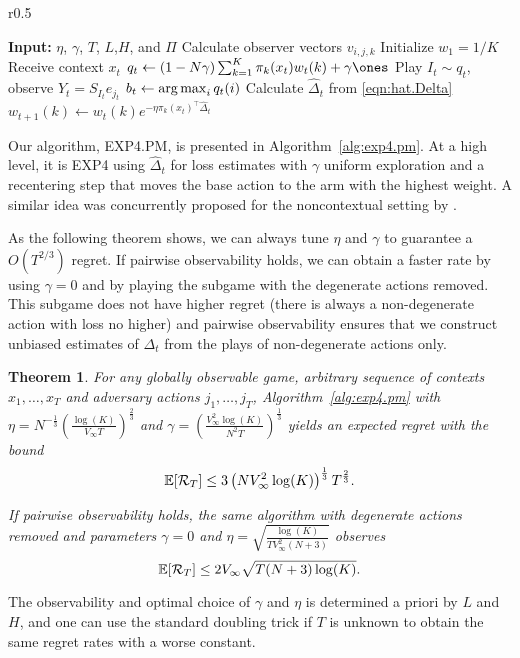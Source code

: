 \documentclass{article}
\newcommand{\regret}{\mathcal{R}}
\newtheorem{theorem}{Theorem}
\begin{document}
  \begin{wrapfigure}[14]{r}{0.5\textwidth}
    \vspace{-1.7em}
\begin{minipage}{.5\textwidth}
\begin{algorithm}[H]
  \caption{Recentered EXP4.PM}
  \label{alg:exp4.pm}
   \begin{algorithmic}
      \STATE \textbf{Input: } $\eta$, $\gamma$, $T$, $L$,$H$, and $\Pi$
      \STATE Calculate observer vectors $v_{i,j,k}$
    \STATE Initialize $w_1 = 1/K$
      \STATE Receive context $x_t$
      \STATE $q_t \leftarrow (1-N \gamma)\sum_{k=1}^K \pi_k(x_t) w_t(k) + \gamma\ones$
      \STATE Play $I_t\sim q_t$, observe $Y_t = S_{I_t} e_{j_t}$ 
      \STATE $b_t \leftarrow \operatorname*{arg\,max}_i q_t(i)$
      \STATE Calculate
         $\hat\Delta_{t}$ from \eqref{eqn:hat.Delta}
      \STATE $w_{t+1}(k) \leftarrow w_t(k)e^{-\eta\pi_k(x_t)^\top \hat\Delta_t}$
      \ENDFOR
\end{algorithmic}
\end{algorithm}
\end{minipage}
\end{wrapfigure}

Our algorithm, \textsc{EXP4.PM}, is presented in Algorithm~\ref{alg:exp4.pm}. At a high level, it is \textsc{EXP4} using  $\hat\Delta_t$ for loss estimates with $\gamma$ uniform exploration and a recentering step that moves the base action to the arm with the highest weight. A similar idea was concurrently proposed for the noncontextual setting by \citet{lattimore2018cleaning}.

As the following theorem shows, we can always tune $\eta$ and $\gamma$ to guarantee a $O(T^{2/3})$ regret. If pairwise observability holds, we can obtain a faster rate by using $\gamma = 0$ and  by playing the subgame with the degenerate actions removed. This subgame does not have higher regret (there is always a non-degenerate action with loss no higher) and pairwise observability ensures that we construct unbiased estimates of $\Delta_t$ from the plays of non-degenerate actions only.
\begin{theorem}\label{thm:exp4.pm4.regret}  
  For any globally observable game, arbitrary sequence of contexts $x_1,\ldots,x_T$ and adversary actions $j_1,\ldots, j_T$, Algorithm~\ref{alg:exp4.pm} with
$\eta = N^{-\frac13} \left(\frac{\log(K)}{V_\infty T}\right)^{\frac23}$
and
$\gamma = \left( \frac{ V_\infty^2 \log(K)}{N^2 T}\right)^{\frac13}$
yields an expected regret with the bound
\[
  \mathbb E[\mathcal R_T] \leq 3 \left(N V_\infty^2 \log(K)\right)^{\frac13} T^{\frac23}.
\]

If pairwise observability holds, the same algorithm with degenerate actions removed and parameters $\gamma = 0$ and 
 $\eta = \sqrt{ \frac{\log(K)}{ T V_\infty^2 (N+3)}}$ observes
\begin{equation*}
  \ex[\regret_T] \leq 2 V_\infty \sqrt{ T (N+3) \log(K)}.
\end{equation*}
\end{theorem}
The observability and optimal choice of $\gamma$ and $\eta$ is determined a priori by $L$ and $H$, and one can use the standard doubling trick if $T$ is unknown to obtain the same regret rates with a worse constant.
\end{document}
